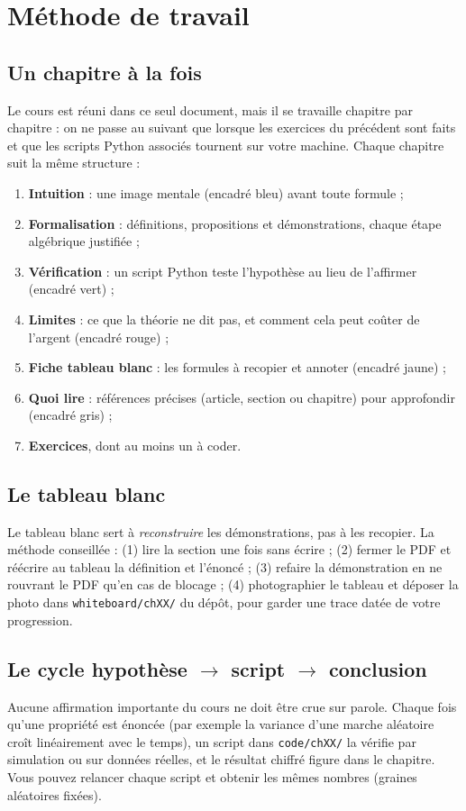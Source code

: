 \section{Méthode de travail}

\subsection{Un chapitre à la fois}
Le cours est réuni dans ce seul document, mais il se travaille chapitre par chapitre : on ne passe au suivant que lorsque les exercices du précédent sont faits et que les scripts Python associés tournent sur votre machine. Chaque chapitre suit la même structure :
\begin{enumerate}
\item \textbf{Intuition} : une image mentale (encadré bleu) avant toute formule ;
\item \textbf{Formalisation} : définitions, propositions et démonstrations, chaque étape algébrique justifiée ;
\item \textbf{Vérification} : un script Python teste l'hypothèse au lieu de l'affirmer (encadré vert) ;
\item \textbf{Limites} : ce que la théorie ne dit pas, et comment cela peut coûter de l'argent (encadré rouge) ;
\item \textbf{Fiche tableau blanc} : les formules à recopier et annoter (encadré jaune) ;
\item \textbf{Quoi lire} : références précises (article, section ou chapitre) pour approfondir (encadré gris) ;
\item \textbf{Exercices}, dont au moins un à coder.
\end{enumerate}

\subsection{Le tableau blanc}
Le tableau blanc sert à \emph{reconstruire} les démonstrations, pas à les recopier. La méthode conseillée : (1) lire la section une fois sans écrire ; (2) fermer le PDF et réécrire au tableau la définition et l'énoncé ; (3) refaire la démonstration en ne rouvrant le PDF qu'en cas de blocage ; (4) photographier le tableau et déposer la photo dans \texttt{whiteboard/chXX/} du dépôt, pour garder une trace datée de votre progression.

\subsection{Le cycle \og hypothèse $\rightarrow$ script $\rightarrow$ conclusion\fg}
Aucune affirmation importante du cours ne doit être crue sur parole. Chaque fois qu'une propriété est énoncée (par exemple \og la variance d'une marche aléatoire croît linéairement avec le temps\fg), un script dans \texttt{code/chXX/} la vérifie par simulation ou sur données réelles, et le résultat chiffré figure dans le chapitre. Vous pouvez relancer chaque script et obtenir les mêmes nombres (graines aléatoires fixées).


